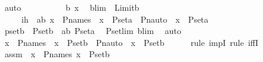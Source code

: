 \begin{isabellebody}
\ auto\isanewline
\ \ \isamarkupfalse%
\ \isanewline
\ \ \ \ \isamarkupfalse%
\ b\ x\ \isamarkupfalse%
\ blim\ {\isacharcolon}{\kern0pt}\ {\isachardoublequoteopen}Limit{\isacharparenleft}{\kern0pt}b{\isacharparenright}{\kern0pt}{\isachardoublequoteclose}\isanewline
\ \ \ \ \ ih\ {\isacharcolon}{\kern0pt}\ {\isachardoublequoteopen}{\isasymforall}a{\isasymin}b{\isachardot}{\kern0pt}\ x\ {\isasymin}\ P{\isacharunderscore}{\kern0pt}names\ {\isasymlongrightarrow}\ x\ {\isasymin}\ P{\isacharunderscore}{\kern0pt}set{\isacharparenleft}{\kern0pt}a{\isacharparenright}{\kern0pt}\ {\isasymlongleftrightarrow}\ Pn{\isacharunderscore}{\kern0pt}auto{\isacharparenleft}{\kern0pt}{\isasympi}{\isacharparenright}{\kern0pt}\ {\isacharbackquote}{\kern0pt}\ x\ {\isasymin}\ P{\isacharunderscore}{\kern0pt}set{\isacharparenleft}{\kern0pt}a{\isacharparenright}{\kern0pt}{\isachardoublequoteclose}\isanewline
\isanewline
\ \ \ \ \isamarkupfalse%
\ psetb\ {\isacharcolon}{\kern0pt}\ {\isachardoublequoteopen}P{\isacharunderscore}{\kern0pt}set{\isacharparenleft}{\kern0pt}b{\isacharparenright}{\kern0pt}\ {\isacharequal}{\kern0pt}\ {\isacharparenleft}{\kern0pt}{\isasymUnion}a{\isacharless}{\kern0pt}b{\isachardot}{\kern0pt}\ P{\isacharunderscore}{\kern0pt}set{\isacharparenleft}{\kern0pt}a{\isacharparenright}{\kern0pt}{\isacharparenright}{\kern0pt}{\isachardoublequoteclose}\ \isamarkupfalse%
\ P{\isacharunderscore}{\kern0pt}set{\isacharunderscore}{\kern0pt}lim\ blim\ \isamarkupfalse%
\ auto\isanewline
\isanewline
\ \ \ \ \isamarkupfalse%
\ {\isachardoublequoteopen}x\ {\isasymin}\ P{\isacharunderscore}{\kern0pt}names\ {\isasymlongrightarrow}\ x\ {\isasymin}\ P{\isacharunderscore}{\kern0pt}set{\isacharparenleft}{\kern0pt}b{\isacharparenright}{\kern0pt}\ {\isasymlongleftrightarrow}\ Pn{\isacharunderscore}{\kern0pt}auto{\isacharparenleft}{\kern0pt}{\isasympi}{\isacharparenright}{\kern0pt}\ {\isacharbackquote}{\kern0pt}\ x\ {\isasymin}\ P{\isacharunderscore}{\kern0pt}set{\isacharparenleft}{\kern0pt}b{\isacharparenright}{\kern0pt}{\isachardoublequoteclose}\isanewline
\ \ \ \ \isamarkupfalse%
\ {\isacharparenleft}{\kern0pt}rule\ impI{\isacharsemicolon}{\kern0pt}\ rule\ iffI{\isacharparenright}{\kern0pt}\isanewline
\ \ \ \ \ \ \isamarkupfalse%
\ assm\ {\isacharcolon}{\kern0pt}\ {\isachardoublequoteopen}x\ {\isasymin}\ P{\isacharunderscore}{\kern0pt}names{\isachardoublequoteclose}\ {\isachardoublequoteopen}x\ {\isasymin}\ P{\isacharunderscore}{\kern0pt}set{\isacharparenleft}{\kern0pt}b{\isacharparenright}{\kern0pt}{\isachardoublequoteclose}\ \isanewline

\end{isabellebody}
